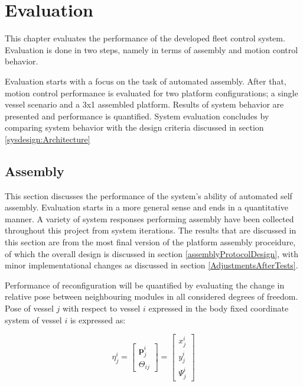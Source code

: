 \chapter{Evaluation}
\label{chap:evaluation}

This chapter evaluates the performance of the developed fleet control system. Evaluation is done in two steps, namely in terms of assembly and motion control behavior. 

Evaluation starts with a focus on the task of automated assembly. After that, motion control performance is evaluated for two platform configurations; a single vessel scenario and a 3x1 assembled platform. Results of system behavior are presented and performance is quantified. System evaluation concludes by comparing system behavior with the design criteria discussed in section \ref{sysdesign:Architecture} 

\section{Assembly}
\label{evaluateAssembly}
This section discusses the performance of the system's ability of automated self assembly. Evaluation starts in a more general sense and ends in a quantitative manner. A variety of system responses performing assembly have been collected throughout this project from system iterations. The results that are discussed in this section are from the most final version of the platform assembly proceidure, of which the overall design is discussed in section \ref{assemblyProtocolDesign}, with minor implementational changes as discussed in section \ref{AdjustmentsAfterTests}. 

Performance of reconfiguration will be quantified by evaluating the change in relative pose between neighbouring modules in all considered degrees of freedom. Pose of vessel $j$ with respect to vessel $i$ expressed in the body fixed coordinate system of vessel $i$ is expressed as:

\begin{equation}
\eta_j^i = \begin{bmatrix} \textbf{p}^{i}_{j} \\[8pt]  \Theta_{ij} \end{bmatrix} = \begin{bmatrix} x^{i}_{j} \\[8pt]  y^{i}_{j} \\[8pt] \Psi^i_j \end{bmatrix}
\label{PerfIndicatorRelativePose}
\end{equation}


